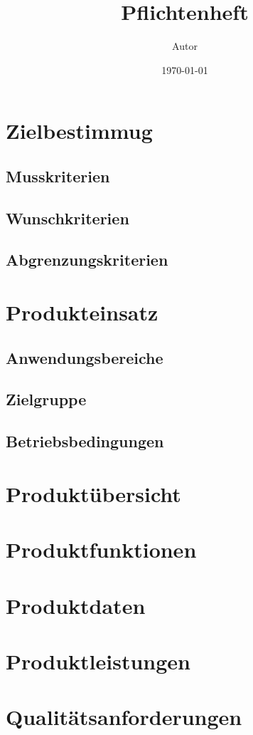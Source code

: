 \documentclass[pdflatex, a4paper, oneside]{scrartcl}
\author{Autor} \title{Pflichtenheft} \date{\today}
\begin{document}
	\maketitle
	\pagebreak
	
	\section{Zielbestimmug}
		\subsection{Musskriterien}
		\subsection{Wunschkriterien}
		\subsection{Abgrenzungskriterien}
	\section{Produkteinsatz}
		\subsection{Anwendungsbereiche}
		\subsection{Zielgruppe}
		\subsection{Betriebsbedingungen}
	\section{Produktübersicht}
	\section{Produktfunktionen}
	\section{Produktdaten}
	\section{Produktleistungen}
	\section{Qualitätsanforderungen}
\end{document}
